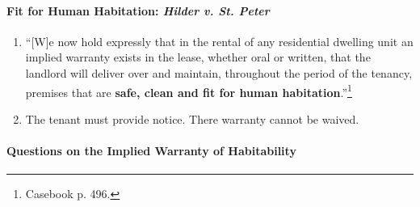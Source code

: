 \paragraph{Fit for Human Habitation: \emph{Hilder v. St. Peter}}

\begin{enumerate}
    \item ``[W]e now hold expressly that in the rental of any residential 
    dwelling unit an implied warranty exists in the lease, whether oral or 
    written, that the landlord will deliver over and maintain, throughout the 
    period of the tenancy, premises that are \textbf{safe, clean and fit for 
    human habitation}.''\footnote{Casebook p. 496.}
    \item The tenant must provide notice. There warranty cannot be waived.
\end{enumerate}

\paragraph{Questions on the Implied Warranty of Habitability} %

